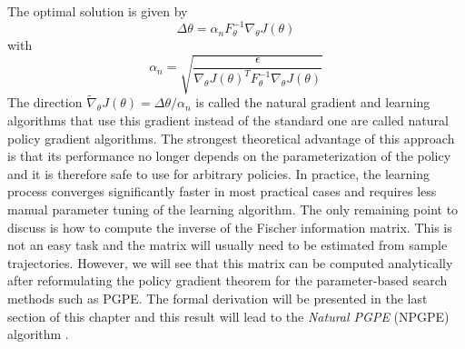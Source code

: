 The optimal solution is given by 
\begin{equation*}
	\Delta \theta = \alpha_n F_\theta^{-1} \nabla_\theta J(\theta)
\end{equation*}
with 
\begin{equation*}
	\alpha_n = \sqrt{\frac{\epsilon}{\nabla_\theta J(\theta)^T F_\theta^{-1} \nabla_\theta J(\theta)} }
\end{equation*}
The direction $\widetilde{\nabla}_\theta J(\theta) = \Delta \theta / \alpha_n$ is called the natural gradient and learning algorithms that use this gradient instead of the standard one are called natural policy gradient algorithms. The strongest theoretical advantage of this approach is that its performance no longer depends on the parameterization of the policy and it is therefore safe to use for arbitrary policies. In practice, the learning process converges significantly faster in most practical cases and requires less manual parameter tuning of the learning algorithm. The only remaining point to discuss is how to compute the inverse of the Fischer information matrix. This is not an easy task and the matrix will usually need to be estimated from sample trajectories. However, we will see that this matrix can be computed analytically after reformulating the policy gradient theorem for the parameter-based search methods such as PGPE. The formal derivation will be presented in the last section of this chapter and this result will lead to the \emph{Natural PGPE} (NPGPE) algorithm \cite{miyamae2010natural}.  